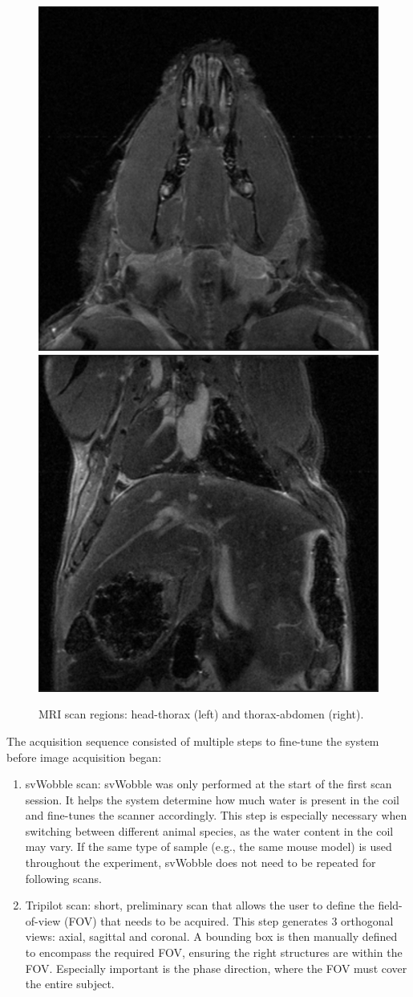 \documentclass[twocolumn]{article}
\begin{document}
\begin{figure}[H]
    \centering
    \includegraphics[width=0.47\linewidth]{head-region.png}
    \hfill
    \includegraphics[width=0.47\linewidth]{thorax-abdomen.png}
    \caption{MRI scan regions: head-thorax (left) and thorax-abdomen (right).}
    \label{fig:scan-orientations}
\end{figure}



The acquisition sequence consisted of multiple steps to fine-tune the system before image acquisition began: 

\begin{enumerate}
\item svWobble scan: svWobble was only performed at the start of the first scan session. It helps the system determine how much water is present in the coil and fine-tunes the scanner accordingly. 
This step is especially necessary when switching between different animal species, as the water content in the coil may vary. 
If the same type of sample (e.g., the same mouse model) is used throughout the experiment, svWobble does not need to be repeated for following scans.
\item Tripilot scan:  short, preliminary scan that allows the user to define the field-of-view (FOV) that needs to be acquired. 
This step generates 3 orthogonal views: axial, sagittal and coronal. A bounding box is then manually defined to encompass the required FOV, ensuring the right structures are within the FOV. 
Especially important is the phase direction, where the FOV must cover the entire subject.
\end{enumerate}
\end{document}

